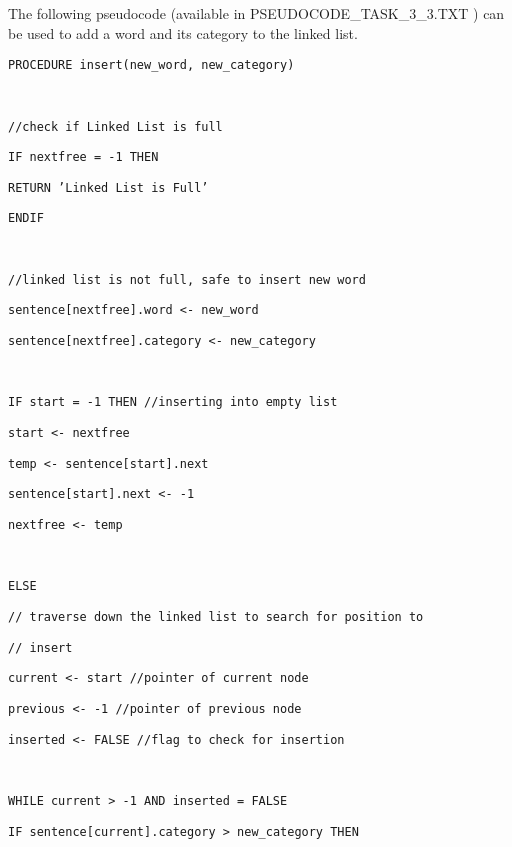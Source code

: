 The following pseudocode (available in PSEUDOCODE\_TASK\_3\_3.TXT
) can be used to add a word and its category to the linked list.

\noindent %
\noindent\begin{minipage}[t]{1\columnwidth}%
\texttt{PROCEDURE insert(new\_word, new\_category)}

\texttt{\bigskip{}
}

\texttt{\qquad{}//check if Linked List is full }

\texttt{\qquad{}IF nextfree = -1 THEN }

\texttt{\qquad{}\qquad{}RETURN 'Linked List is Full' }

\texttt{\qquad{}ENDIF }

\texttt{\bigskip{}
}

\texttt{\qquad{}//linked list is not full, safe to insert new word }

\texttt{\qquad{}sentence{[}nextfree{]}.word <- new\_word }

\texttt{\qquad{}sentence{[}nextfree{]}.category <- new\_category}

\texttt{\bigskip{}
}

\texttt{\qquad{}IF start = -1 THEN //inserting into empty list }

\texttt{\qquad{}\qquad{}start <- nextfree}

\texttt{\qquad{}\qquad{}temp <- sentence{[}start{]}.next }

\texttt{\qquad{}\qquad{}sentence{[}start{]}.next <- -1 }

\texttt{\qquad{}\qquad{}nextfree <- temp}

\texttt{\bigskip{}
}

\texttt{\qquad{}ELSE }

\texttt{\qquad{}// traverse down the linked list to search for position
to}

\texttt{\qquad{}// insert }

\texttt{\qquad{}\qquad{}current <- start //pointer of current node }

\texttt{\qquad{}\qquad{}previous <- -1 //pointer of previous node }

\texttt{\qquad{}\qquad{}inserted <- FALSE //flag to check for insertion}

\texttt{\bigskip{}
}

\texttt{\qquad{}\qquad{}WHILE current > -1 AND inserted = FALSE}

\texttt{\qquad{}\qquad{}\qquad{}IF sentence{[}current{]}.category
> new\_category THEN \bigskip{}
}


\end{minipage}

